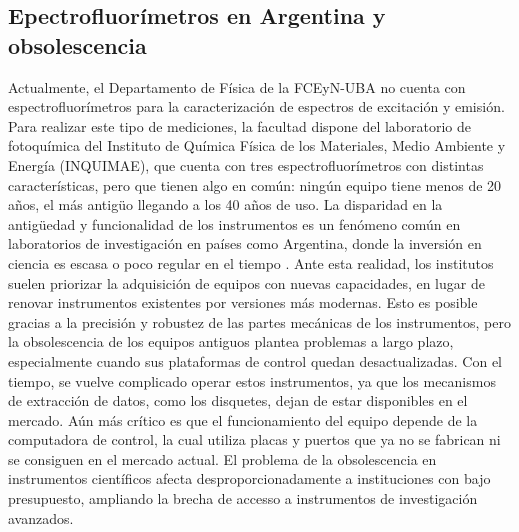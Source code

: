 \subsection{Epectrofluorímetros en Argentina y obsolescencia}

Actualmente, el Departamento de Física de la FCEyN-UBA no cuenta con espectrofluorímetros para la caracterización de espectros de excitación y emisión.  
Para realizar este tipo de mediciones, la facultad dispone del laboratorio de fotoquímica del Instituto de Química Física de los Materiales, Medio Ambiente y Energía (INQUIMAE), que cuenta con tres espectrofluorímetros con distintas características, pero que tienen algo en común: ningún equipo tiene menos de 20 años, el más antigüo llegando a los 40 años de uso.
La disparidad en la antigüedad y funcionalidad de los instrumentos es un fenómeno común en laboratorios de investigación en países como Argentina, donde la inversión en ciencia es escasa o poco regular en el tiempo \cite{cioccaRealityScientificResearch2017}. 
Ante esta realidad, los institutos suelen priorizar la adquisición de equipos con nuevas capacidades, en lugar de renovar instrumentos existentes por versiones más modernas.  
Esto es posible gracias a la precisión y robustez de las partes mecánicas de los instrumentos, pero la obsolescencia de los equipos antiguos plantea problemas a largo plazo, especialmente cuando sus plataformas de control quedan desactualizadas.  
Con el tiempo, se vuelve complicado operar estos instrumentos, ya que los mecanismos de extracción de datos, como los disquetes, dejan de estar disponibles en el mercado. 
Aún más crítico es que el funcionamiento del equipo depende de la computadora de control, la cual utiliza placas y puertos que ya no se fabrican ni se consiguen en el mercado actual.  
El problema de la obsolescencia en instrumentos científicos afecta desproporcionadamente a instituciones con bajo presupuesto, ampliando la brecha de accesso a instrumentos de investigación avanzados.

